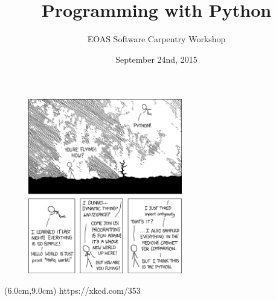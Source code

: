 \documentclass{beamer}
\title[Shell Lesson]{Programming with Python}
\subtitle[]{EOAS Software Carpentry Workshop }
\date[Sep 2015]{September 24nd, 2015}
\begin{document}





 
\begin{frame}[plain]
  
\titlepage


\end{frame}




\begin{frame}

\begin{figure}[htbp]
   \centering
  \includegraphics[width=0.6\textwidth]{figs_slides/python_xkcd.png} 
\end{figure}

\begin{textblock*}{7cm}(6.0cm,9.0cm)
		\centering
			\tiny{https://xkcd.com/353 }
\end{textblock*}



\end{frame}
\end{document}
